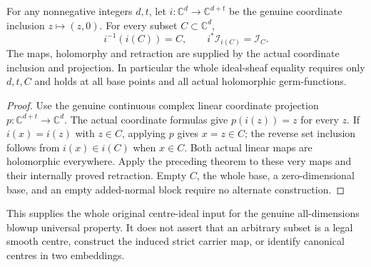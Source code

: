\begin{theorem}
\label{hir:actual-zero-section-whole-centre-sheaf}
\leanok
For any nonnegative integers $d,t$, let
$i:\mathbb C^d\to\mathbb C^{d+t}$ be the genuine coordinate inclusion
$z\mapsto(z,0)$. For every subset $C\subset\mathbb C^d$,
\[
 i^{-1}(i(C))=C,\qquad
 i^*\mathcal I_{i(C)}=\mathcal I_C.
\]
The maps, holomorphy and retraction are supplied by the actual coordinate
inclusion and projection. In particular the whole ideal-sheaf equality
requires only $d,t,C$ and holds at all base points and all actual
holomorphic germ-functions.
\end{theorem}
\begin{proof}
Use the genuine continuous complex linear coordinate projection
$p:\mathbb C^{d+t}\to\mathbb C^d$. The actual coordinate formulas give
$p(i(z))=z$ for every $z$. If $i(x)=i(z)$ with $z\in C$, applying $p$
gives $x=z\in C$; the reverse set inclusion follows from $i(x)\in i(C)$
when $x\in C$. Both actual linear maps are holomorphic everywhere.
Apply the preceding theorem to these very maps and their internally
proved retraction. Empty $C$, the whole base, a zero-dimensional base,
and an empty added-normal block require no alternate construction.
\end{proof}

This supplies the whole original centre-ideal input for the genuine
all-dimensions blowup universal property. It does not assert that an
arbitrary subset is a legal smooth centre, construct the induced strict
carrier map, or identify canonical centres in two embeddings.
